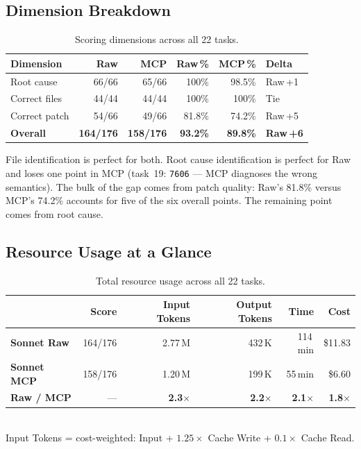 \subsection{Dimension Breakdown}

\begin{table}[h]
\centering
\caption{Scoring dimensions across all 22 tasks.}\label{tab:dim-cmp-sonnet}
\begin{tabular}{lrrrrl}
\toprule
\textbf{Dimension} & \textbf{Raw} & \textbf{MCP} & \textbf{Raw\,\%} & \textbf{MCP\,\%} & \textbf{Delta} \\
\midrule
Root cause   & 66/66 & 65/66 & 100\%  & 98.5\% & Raw\,+1 \\
Correct files & 44/44 & 44/44 & 100\%  & 100\%  & Tie \\
Correct patch & 54/66 & 49/66 & 81.8\% & 74.2\% & Raw\,+5 \\
\midrule
\textbf{Overall} & \textbf{164/176} & \textbf{158/176} & \textbf{93.2\%} & \textbf{89.8\%} & \textbf{Raw\,+6} \\
\bottomrule
\end{tabular}
\end{table}

\noindent
File identification is perfect for both.
Root cause identification is perfect for Raw and loses one point in MCP
(task~19: \texttt{7606} --- MCP diagnoses the wrong semantics).
The bulk of the gap comes from patch quality: Raw's 81.8\% versus MCP's
74.2\% accounts for five of the six overall points.
The remaining point comes from root cause.

\subsection{Resource Usage at a Glance}

\begin{table}[h]
\centering
\caption{Total resource usage across all 22 tasks.}\label{tab:resources-sonnet}
\begin{tabular}{lrrrrr}
\toprule
& \textbf{Score} & \textbf{Input Tokens} & \textbf{Output Tokens} & \textbf{Time} & \textbf{Cost} \\
\midrule
\textbf{Sonnet Raw} & 164/176 & 2.77\,M & 432\,K & 114\,min & \$11.83 \\
\textbf{Sonnet MCP} & 158/176 & 1.20\,M & 199\,K &  55\,min & \$6.60 \\
\midrule
\textbf{Raw / MCP}  & ---     & \textbf{2.3$\times$} & \textbf{2.2$\times$} & \textbf{2.1$\times$} & \textbf{1.8$\times$} \\
\bottomrule
\end{tabular}
\\[4pt]
{\footnotesize Input Tokens = cost-weighted: Input + $1.25 \times$ Cache Write + $0.1 \times$ Cache Read.}
\end{table}

